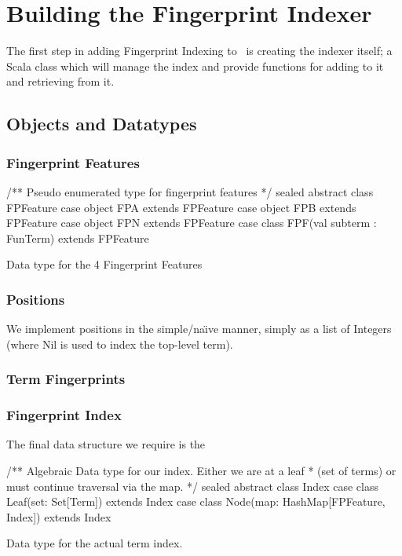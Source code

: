 \section{Building the Fingerprint Indexer}
\label{sec:initial}

The first step in adding Fingerprint Indexing to \beagle\ is creating the indexer
itself; a Scala class which will manage the index and provide functions for adding
to it and retrieving from it. 

\subsection{Objects and Datatypes}

\subsubsection{Fingerprint Features}

\begin{listing}[H]
\begin{scalacode}
/** Pseudo enumerated type for fingerprint features */
sealed abstract class FPFeature
case object FPA extends FPFeature 
case object FPB extends FPFeature
case object FPN extends FPFeature
case class  FPF(val subterm : FunTerm) extends FPFeature
\end{scalacode}
\caption{Data type for the 4 Fingerprint Features \protect\cite[p5]{shulz12}}
\label{lst:featuredata}
\end{listing}

\subsubsection{Positions}

We implement positions in the simple/na\"{\i}ve manner, simply as a list of
Integers (where Nil is used to index the top-level term).

\subsubsection{Term Fingerprints}

\subsubsection{Fingerprint Index}

The final data structure we require is the 

\begin{listing}[H]
\begin{scalacode}
/** Algebraic Data type for our index. Either we are at a leaf
  * (set of terms) or must continue traversal via the map. */ 
sealed abstract class Index
case class Leaf(set: Set[Term])                 extends Index
case class Node(map: HashMap[FPFeature, Index]) extends Index
\end{scalacode}
\caption{Data type for the actual term index. \protect\cite[p7]{shulz12}}
\label{lst:indexdata}
\end{listing}


